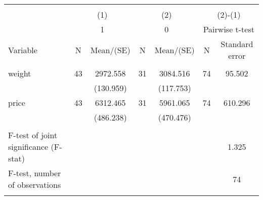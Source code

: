 
\begin{tabular}{@{\extracolsep{5pt}}lcccccc}
\\[-1.8ex]\hline \hline \\[-1.8ex]
 & \multicolumn{2}{c}{(1)}  & \multicolumn{2}{c}{(2)}  & \multicolumn{2}{c}{(2)-(1)} \\
 & \multicolumn{2}{c}{1}  & \multicolumn{2}{c}{0}  & \multicolumn{2}{c}{Pairwise t-test}  \\
Variable & N & Mean/(SE) & N & Mean/(SE) & N & Standard error \\ \hline \\[-1.8ex] 
weight   & 43    & 2972.558    & 31    & 3084.516    & 74    & 95.502   \\
 &   & (130.959)  &   & (117.753)  &   &   \\
price   & 43    & 6312.465    & 31    & 5961.065    & 74    & 610.296   \\
 &   & (486.238)  &   & (470.476)  &   &   \\
\hline \\[-1.8ex]
F-test of joint significance (F-stat) & &   & &     & &  1.325   \\
F-test, number of observations & &   & &   & &  74   \\
\hline \\[-1.8ex]

\end{tabular}
